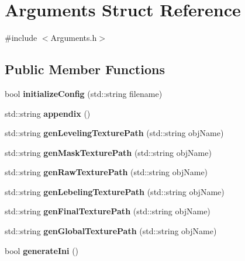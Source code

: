 \hypertarget{struct_arguments}{}\section{Arguments Struct Reference}
\label{struct_arguments}


{\ttfamily \#include $<$Arguments.\+h$>$}

\subsection*{Public Member Functions}
\begin{DoxyCompactItemize}
\item 
\hypertarget{struct_arguments_adb3df83131fa2be8783755b93c28c3de}{}bool {\bfseries initialize\+Config} (std\+::string filename)\label{struct_arguments_adb3df83131fa2be8783755b93c28c3de}

\item 
\hypertarget{struct_arguments_a693a6a2a4334f5e34b3eb5ed6a555b28}{}std\+::string {\bfseries appendix} ()\label{struct_arguments_a693a6a2a4334f5e34b3eb5ed6a555b28}

\item 
\hypertarget{struct_arguments_a84cff19e3bdd988ba096e1a81e747103}{}std\+::string {\bfseries gen\+Leveling\+Texture\+Path} (std\+::string obj\+Name)\label{struct_arguments_a84cff19e3bdd988ba096e1a81e747103}

\item 
\hypertarget{struct_arguments_acc8d0c6a9477669bee3d9fe79e0b6d6c}{}std\+::string {\bfseries gen\+Mask\+Texture\+Path} (std\+::string obj\+Name)\label{struct_arguments_acc8d0c6a9477669bee3d9fe79e0b6d6c}

\item 
\hypertarget{struct_arguments_af256b45e3009486a4ea5066f8b7a080f}{}std\+::string {\bfseries gen\+Raw\+Texture\+Path} (std\+::string obj\+Name)\label{struct_arguments_af256b45e3009486a4ea5066f8b7a080f}

\item 
\hypertarget{struct_arguments_ac2161fcafef758c6418e6d7113fedee2}{}std\+::string {\bfseries gen\+Lebeling\+Texture\+Path} (std\+::string obj\+Name)\label{struct_arguments_ac2161fcafef758c6418e6d7113fedee2}

\item 
\hypertarget{struct_arguments_ae4c2ab8514254a581f2124d4095ffe06}{}std\+::string {\bfseries gen\+Final\+Texture\+Path} (std\+::string obj\+Name)\label{struct_arguments_ae4c2ab8514254a581f2124d4095ffe06}

\item 
\hypertarget{struct_arguments_ab6012180dadee8fff0a7271aafd96089}{}std\+::string {\bfseries gen\+Global\+Texture\+Path} (std\+::string obj\+Name)\label{struct_arguments_ab6012180dadee8fff0a7271aafd96089}

\item 
\hypertarget{struct_arguments_a6db8fa82b73c39649ab151ef63085f0f}{}bool {\bfseries generate\+Ini} ()\label{struct_arguments_a6db8fa82b73c39649ab151ef63085f0f}

\end{DoxyCompactItemize}
